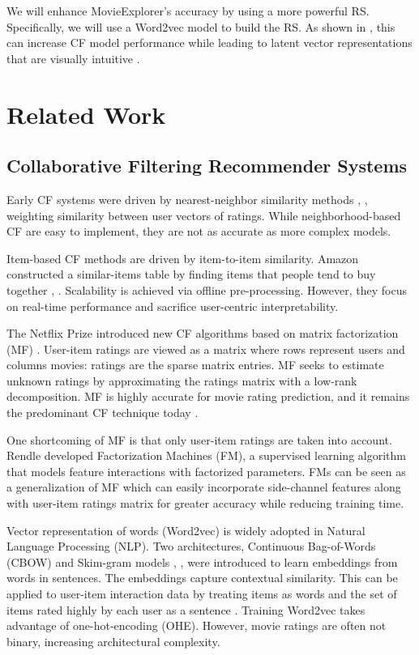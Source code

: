 \documentclass[sigchi, 12pt, nonacm=true, timestamp=true, screen=true]{acmart}
\begin{document}
We will enhance MovieExplorer’s accuracy  by using a more powerful RS. Specifically, we will use a Word2vec model \cite{mikolov2013distributed} to build the RS. As shown in \cite{ozsoy2016word}, this can increase CF model performance while leading to latent vector representations that are visually intuitive \cite{mikolov2013distributed}. 

\section{Related Work}
\subsection{Collaborative Filtering Recommender Systems}

Early CF systems were driven by nearest-neighbor similarity methods \cite{herlocker1999algorithmic}, \cite{smith2017two}, weighting similarity between user vectors of ratings. While neighborhood-based CF are easy to implement, they are not as accurate as more complex models.

Item-based CF methods are driven by item-to-item similarity. Amazon constructed a similar-items table by finding items that people tend to buy together \cite{linden2003amazon}, \cite{smith2017two}. Scalability is achieved via offline pre-processing. However, they focus on real-time performance and sacrifice user-centric interpretability. 

The Netflix Prize introduced new CF algorithms based on matrix factorization (MF) \cite{funk2006netflix}. User-item ratings are viewed as a matrix where rows represent users and columns movies: ratings are the sparse matrix entries. MF seeks to estimate unknown ratings by approximating the ratings matrix with a low-rank decomposition. MF is highly accurate for movie rating prediction, and it remains the predominant CF technique today \cite{koren2008factorization}. 

One shortcoming of MF is that only user-item ratings are taken into account. Rendle \cite{rendle2012factorization} developed Factorization Machines (FM), a supervised learning algorithm that models feature interactions with factorized parameters.  FMs can be seen as a generalization of MF which can easily incorporate side-channel features along with user-item ratings matrix for greater accuracy while reducing training time.

Vector representation of words (Word2vec) is widely adopted in Natural Language Processing (NLP). Two  architectures, Continuous Bag-of-Words (CBOW) and Skim-gram models \cite{mikolov2013efficient},  \cite{mikolov2013distributed}, \cite{rong2014word2vec} were introduced to learn embeddings from words in sentences. The embeddings capture contextual similarity. This can be applied to user-item interaction data by treating items as words and the set of items rated highly by each user as a sentence \cite{ozsoy2016word}. Training Word2vec takes advantage of one-hot-encoding (OHE). However, movie ratings are often not binary, increasing architectural complexity.
\end{document}
